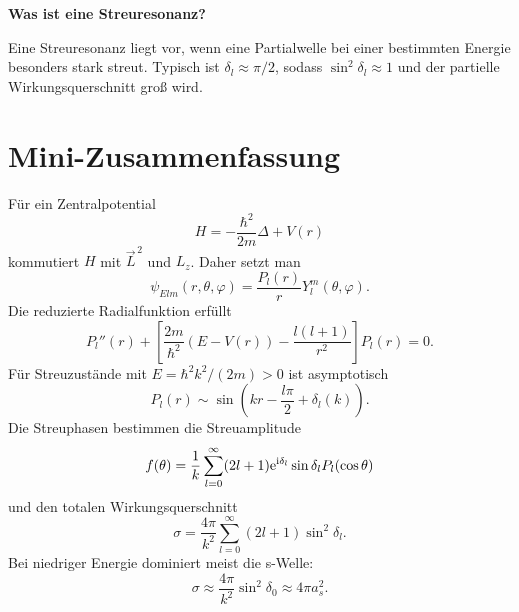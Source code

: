\begin{examtipbox}
\textbf{Was ist eine Streuresonanz?}

Eine Streuresonanz liegt vor, wenn eine Partialwelle bei einer bestimmten Energie besonders stark streut. Typisch ist \(\delta_l\approx\pi/2\), sodass \(\sin^2\delta_l\approx1\) und der partielle Wirkungsquerschnitt groß wird.
\end{examtipbox}

\section{Mini-Zusammenfassung}

\begin{answerbox}
Für ein Zentralpotential
\[
    H=-\frac{\hbar^2}{2m}\Delta+V(r)
\]
kommutiert \(H\) mit \(\vec L^{\,2}\) und \(L_z\). Daher setzt man
\[
    \psi_{Elm}(r,\theta,\varphi)=\frac{P_l(r)}{r}Y_l^m(\theta,\varphi).
\]
Die reduzierte Radialfunktion erfüllt
\[
    P_l''(r)+\left[\frac{2m}{\hbar^2}(E-V(r))-\frac{l(l+1)}{r^2}\right]P_l(r)=0.
\]
Für Streuzustände mit \(E=\hbar^2k^2/(2m)>0\) ist asymptotisch
\[
    P_l(r)\sim \sin\left(kr-\frac{l\pi}{2}+\delta_l(k)\right).
\]
Die Streuphasen bestimmen die Streuamplitude
\[
    f(\theta)=\frac{1}{k}\sum_{l=0}^{\infty}(2l+1)\mathrm{e}^{\mathrm{i}\delta_l}\sin\delta_l P_l(\cos\theta)
\]
und den totalen Wirkungsquerschnitt
\[
    \sigma=\frac{4\pi}{k^2}\sum_{l=0}^{\infty}(2l+1)\sin^2\delta_l.
\]
Bei niedriger Energie dominiert meist die s-Welle:
\[
    \sigma\approx\frac{4\pi}{k^2}\sin^2\delta_0\approx4\pi a_s^2.
\]
\end{answerbox}
